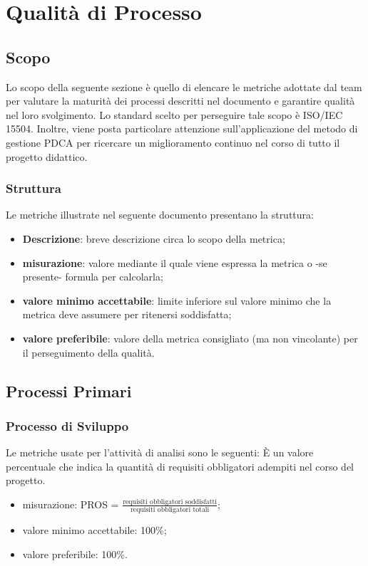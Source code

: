 \section{Qualità di Processo}

\subsection{Scopo}
Lo scopo della seguente sezione è quello di elencare le metriche adottate dal team \Gruppo{} per valutare la maturità dei processi descritti nel documento \textit{\NdP} e garantire qualità nel loro svolgimento. Lo standard scelto per perseguire tale scopo è ISO/IEC 15504. Inoltre, viene posta particolare attenzione sull'applicazione del metodo di gestione PDCA per ricercare un miglioramento continuo nel corso di tutto il progetto didattico.

\subsubsection{Struttura}
Le metriche illustrate nel seguente documento presentano la struttura:
\begin{itemize}
	\item{\textbf{Descrizione}: breve descrizione circa lo scopo della metrica;}
	\item{\textbf{misurazione}: valore mediante il quale viene espressa la metrica o -se presente- formula per calcolarla;}
	\item{\textbf{valore minimo accettabile}: limite inferiore sul valore minimo che la metrica deve assumere per ritenersi soddisfatta;}
	\item{\textbf{valore preferibile}: valore della metrica consigliato (ma non vincolante) per il perseguimento della qualità.}
\end{itemize}

\subsection{Processi Primari}

	\subsubsection{Processo di Sviluppo}
	
		Le metriche usate per l'attività di analisi sono le seguenti:
			È un valore percentuale che indica la quantità di requisiti obbligatori adempiti nel corso del progetto.
		\begin{itemize}
			\item{misurazione: PROS = $\displaystyle\frac{\mbox{requisiti obbligatori soddisfatti}}{\mbox{requisiti obbligatori totali}}$;}
			\item{valore minimo accettabile: 100\%;}
			\item{valore preferibile: 100\%.}
		\end{itemize}

